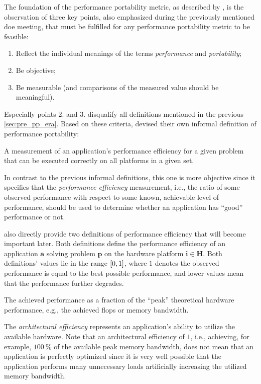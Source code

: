 The foundation of the performance portability metric, as described by \citeauthor{pennycook_implications_2019}, is the observation of three key points, also emphasized during the previously mentioned \gls{doe} meeting, that must be fulfilled for any performance portability metric to be feasible:
\begin{enumerate}
    \item Reflect the individual meanings of the terms \textit{performance} and \textit{portability};
    \item Be objective;
    \item Be measurable (and comparisons of the measured value should be meaningful).
\end{enumerate}
Especially points 2. and 3. disqualify all definitions mentioned in the previous \autoref{sec:pre_pp_era}.
Based on these criteria, \citeauthor{pennycook_implications_2019} devised their own informal definition of performance portability: 
\begin{quotebox}{\citet{pennycook_implications_2019}}
    A measurement of an application’s performance efficiency for a given problem that can be executed correctly on all platforms in a given set.
\end{quotebox}
In contrast to the previous informal definitions, this one is more objective since it specifies that the \textit{performance efficiency} measurement, i.e., the ratio of some observed performance with respect to some known, achievable level of performance, should be used to determine whether an application has \enquote{good} performance or not. 

\citeauthor{pennycook_implications_2019} also directly provide two definitions of performance efficiency that will become important later. 
Both definitions define the performance efficiency of an application $\mathbf{a}$ solving problem $\mathbf{p}$ on the hardware platform $\mathbf{i \in H}$. 
Both definitions' values lie in the range $\interval{0}{1}$, where $1$ denotes the observed performance is equal to the best possible performance, and lower values mean that the performance further degrades. 

\begin{definition}\label{def:arch_eff}
    The achieved performance as a fraction of the \enquote{peak} theoretical hardware performance, e.g., the achieved \gls{flops} or memory bandwidth.
\end{definition}
The \textit{architectural efficiency} represents an application's ability to utilize the available hardware. 
Note that an architectural efficiency of $1$, i.e., achieving, for example, $\SI{100}{\percent}$ of the available peak memory bandwidth, does not mean that an application is perfectly optimized since it is very well possible that the application performs many unnecessary loads artificially increasing the utilized memory bandwidth. 

